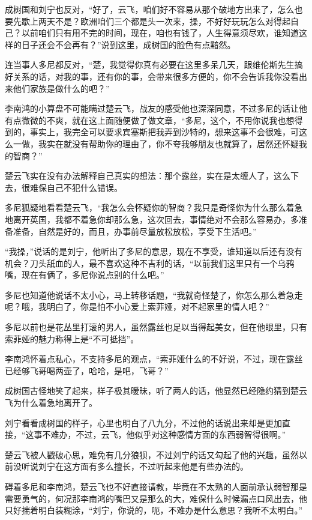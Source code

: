 成树国和刘宁也反对，“好了，云飞，咱们好不容易从那个破地方出来了，怎么也要先歇上两天不是？欧洲咱们三个都是头一次来，操，不好好玩玩怎么对得起自己？以前咱们只有用不完的时间，现在，咱也有钱了，人生得意须尽欢，谁知道这样的日子还会不会再有？”说到这里，成树国的脸色有点黯然。

连当事人多尼都反对，“楚，我觉得你真有必要在这里多呆几天，跟维伦斯先生搞好关系的话，对我的事，还有你的事，会带来很多方便的，你不会告诉我你没看出来他们家族是做什么的吧？”

李南鸿的小算盘不可能瞒过楚云飞，战友的感受他也深深同意，不过多尼的话让他有点微微的不爽，就在这上面随便做了做文章，“多尼，这个，不用你说我也想得到的，事实上，我完全可以要求宾塞斯把我弄到沙特的，想来这事不会很难，可这么一做，我实在就没有帮助你的理由了，你不夸我够朋友也就算了，居然还怀疑我的智商？”

楚云飞实在没有办法解释自己真实的想法：那个露丝，实在是太缠人了，这么下去，很难保自己不犯什么错误。

多尼狐疑地看看楚云飞，“我怎么会怀疑你的智商？我只是奇怪你为什么那么着急地离开英国，我都不着急你却那么急，这次回去，事情绝对不会那么容易办，多准备准备，自然是好的，而且，办事前尽量放松放松，享受下生活吧。”

“我操，”说话的是刘宁，他听出了多尼的意思，现在不享受，谁知道以后还有没有机会？刀头舐血的人，最不喜欢这种不吉利的话，“以前我们这里只有一个乌鸦嘴，现在有俩了，多尼你说点别的什么吧。”

多尼也知道他说话不太小心，马上转移话题，“我就奇怪楚了，你怎么那么着急走呢？哦，我明白了，你是怕不小心爱上索菲娅，对不起家里的情人吧？”

多尼以前也是花丛里打滚的男人，虽然露丝也足以当得起美女，但在他眼里，只有索菲娅的魅力称得上是“不可抵挡”。

李南鸿怀着点私心，不支持多尼的观点，“索菲娅什么的不好说，不过，现在露丝已经够飞哥喝两壶了，哈哈，是吧，飞哥？”

成树国古怪地笑了起来，样子极其暧昧，听了两人的话，他显然已经隐约猜到楚云飞为什么着急地离开了。

刘宁看看成树国的样子，心里也明白了八九分，不过他的话说出来却是更加直接，“这事不难办，不过，云飞，他似乎对这种感情方面的东西弱智得很啊。”

楚云飞被人戳破心思，难免有几分狼狈，不过刘宁的话又勾起了他的兴趣，虽然以前没听说刘宁在这方面有多么擅长，不过听起来他是有些办法的。

碍着多尼和李南鸿，楚云飞也不好直接请教，毕竟在不太熟的人面前承认弱智那是需要勇气的，何况那李南鸿的嘴巴又是那么的大，难保什么时候漏点口风出去，他只好揣着明白装糊涂，“刘宁，你说的，呃，不难办是什么意思？我听不太明白。”

